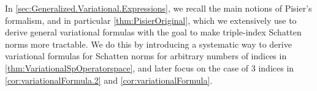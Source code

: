 \documentclass[11pt]{article}
\newcommand{\1}{\ensuremath{\mathbbm{1}}}
\theoremstyle{newdefinition}
\theoremstyle{newplain}
\theoremstyle{myplain}
\begin{document}
In \cref{sec:Generalized.Variational.Expressions}, we recall the main notions of Pisier's formalism, and in particular \cref{thm:PisierOriginal}, which we extensively use to derive  general variational formulas with the goal to make triple-index Schatten norms more tractable. 
We do this by introducing a systematic way to derive variational formulas for Schatten norms for arbitrary numbers of indices in \cref{thm:VariationalSpOperatorspace}, and later focus on the case of 3 indices in \cref{cor:variationalFormula.2} and \cref{cor:variationalFormula}.
\end{document}
